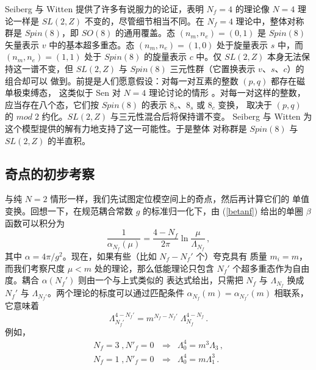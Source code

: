 Seiberg 与 Witten 提供了许多有说服力的论证，表明 $N_f = 4$ 的理论像
$N = 4$ 理论一样是 $SL(2,Z)$ 不变的，尽管细节相当不同。在 $N_f=4$
理论中，整体对称群是 $Spin(8)$，即 $SO(8)$ 的通用覆盖。态
$(n_m, n_e)=(0,1)$ 是 $Spin(8)$ 矢量表示 $v$ 中的基本超多重态。态
$(n_m, n_e)=(1,0)$ 处于旋量表示 $s$ 中，而 $(n_m, n_e)=(1,1)$ 处于
$Spin(8)$ 的旋量表示 $c$ 中。仅 $SL(2,Z)$ 本身无法保持这一谱不变，但
$SL(2,Z)$ 与 $Spin(8)$ 三元性群（它置换表示 $v$、$s$、$c$）的组合却可以
做到。前提是人们愿意假设：对每一对互素的整数 $(p,q)$ 都存在磁单极束缚态，
这类似于 Sen 对 $N=4$ 理论讨论的情形 \cite{sen}。对每一对这样的整数，
应当存在八个态，它们按 $Spin(8)$ 的表示 $8_v$、$8_s$ 或 $8_c$ 变换，
取决于 $(p,q)$ 的 $mod \; 2$ 约化。$SL(2,Z)$ 与三元性混合后将保持谱不变。
Seiberg 与 Witten 为这个模型提供的解有力地支持了这一可能性。于是整体
对称群是 $Spin(8)$ 与 $SL(2,Z)$ 的半直积。


\subsection{奇点的初步考察}

与纯 $N = 2$ 情形一样，我们先试图定位模空间上的奇点，然后再计算它们的
单值变换。回想一下，在规范耦合常数 $g$ 的标准归一化下，由 (\ref{betanf})
给出的单圈 $\beta$ 函数可以积分为
$$
\frac{1}{\alpha_{N_f}(\mu)} = \frac{4-N_f}{2 \pi} \ln 
\frac{\mu}{\Lambda_{N_f}}\,,
$$
其中 $\alpha=4\pi/g^2$。现在，如果有些（比如 $N_f-N_f'$ 个）夸克具有
质量 $m_i=m$，而我们考察尺度 $\mu < m$ 处的理论，那么低能理论只包含
$N_f'$ 个超多重态作为自由度。耦合 $\alpha(N_f')$ 则由一个与上式类似的
表达式给出，只需把 $N_f$ 与 $\Lambda_{N_f}$ 换成 $N_f'$ 与
$\Lambda_{N_f'}$。两个理论的标度可以通过匹配条件
$\alpha_{N_f}(m) =\alpha_{N_f'}(m)$ 相联系，它意味着
$$
\Lambda^{4-N_f'}_{N_f'} = m^{N_f - N_f'}\;\Lambda_{N_f}^{4-N_f}\,.
$$
例如，
$$
\begin{array}{lcl}
N_f = 3 \;, N'_f = 0\, &\Rightarrow& \Lambda^{4}_{0} = m^3 \Lambda_3\,,\\
N_f = 1 \;, N'_f = 0\, &\Rightarrow& \Lambda^{4}_{0} = m \Lambda_{1}^{3}\,.
\end{array}
$$

